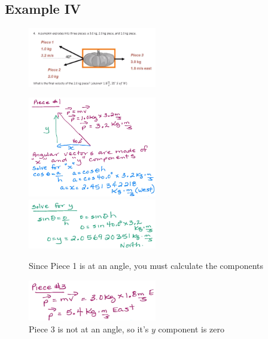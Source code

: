 \documentclass[a4paper,12pt]{article}
\begin{document}
\subsection{Example IV}
\begin{figure}[H]
    \centering
    \includegraphics[width=0.50\textwidth]{q-explode-4}
\end{figure}
\begin{figure}[H]
    \centering
    \caption{Since Piece 1 is at an angle, you must calculate the components}
    \includegraphics[width=0.50\textwidth]{q-explode-4a}
    \includegraphics[width=0.50\textwidth]{q-explode-4b}
\end{figure}
\begin{figure}[H]
    \centering
    \caption{Piece 3 is not at an angle, so it's $y$ component is zero}
    \includegraphics[width=0.50\textwidth]{q-explode-4c}
\end{figure}
\end{document}
